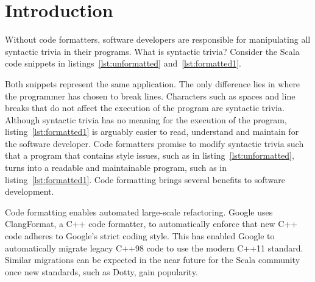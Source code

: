 \section{Introduction} %
\label{sec:Introduction}
\lstset{style=scala}
Without code formatters, software developers are responsible for manipulating all syntactic trivia in their programs.
What is syntactic trivia?
Consider the Scala code snippets in listings~\ref{lst:unformatted} and~\ref{lst:formatted1}.

\begin{minipage}{.45\textwidth}

\end{minipage}
\hfil
\begin{minipage}{.45\textwidth}

\end{minipage}

Both snippets represent the same application.
The only difference lies in where the programmer has chosen to break lines.
Characters such as spaces and line breaks that do not affect the execution of the program are syntactic trivia.
Although syntactic trivia has no meaning for the execution of the program, listing~\ref{lst:formatted1} is arguably easier to read, understand and maintain for the software developer.
Code formatters promise to modify syntactic trivia such that a program that contains style issues, such as in listing~\ref{lst:unformatted}, turns into a readable and maintainable program, such as in listing~\ref{lst:formatted1}.
Code formatting brings several benefits to software development.

Code formatting enables automated large-scale refactoring.
Google uses ClangFormat\autocite{jasper_clangformat_2013}, a C++ code formatter, to automatically enforce that new C++ code adheres to Google's strict coding style\autocite{_google_????}.
This has enabled Google to automatically migrate legacy C++98 code to use the modern C++11 standard\autocite{wright_large-scale_2013}.
Similar migrations can be expected in the near future for the Scala community once new standards, such as Dotty\autocite{rompf_f_2015}, gain popularity.

